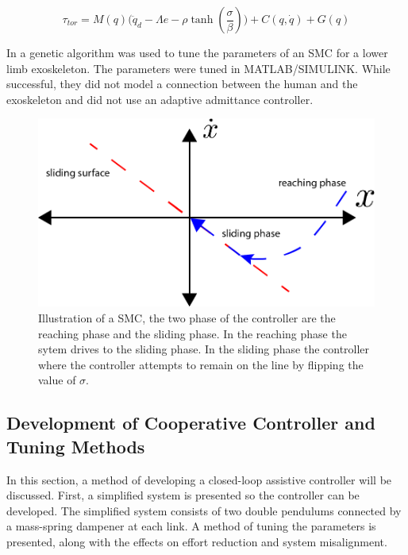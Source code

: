 \begin{equation}
        \tau_{tor} = M(q) \Big( \ddot{q}_d  - \Lambda e - \rho \tanh(\frac{\sigma}{\beta}) \Big) + C( q, \dot{q} ) + G(q) 
    \label{eq:SMCcnrl}
\end{equation}






In \cite{long2016robust} a genetic algorithm was used to tune the parameters of an SMC for a lower limb exoskeleton. The parameters were tuned in MATLAB/SIMULINK. While successful, they did not model a connection between the human and the exoskeleton and did not use an adaptive admittance controller. 

\begin{figure}
    \centering
    \includegraphics[width=\linewidth]{images/controllers/SMC.png}
    \caption[Illustration of a SMC]{Illustration of a SMC, the two phase of the controller are the reaching phase and the sliding phase. In the reaching phase the sytem drives to the sliding phase. In the sliding phase the controller where the controller attempts to remain on the line by flipping the value of $\sigma$. }
    \label{fig:SMC}
\end{figure}

\subsection{Development of Cooperative Controller and Tuning Methods}

In this section, a method of developing a closed-loop assistive controller will be discussed. First, a simplified system is presented so the controller can be developed. The simplified system consists of two double pendulums connected by a mass-spring dampener at each link. A method of tuning the parameters is presented, along with the effects on effort reduction and system misalignment.

